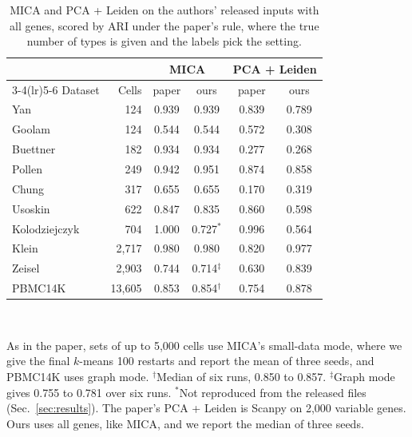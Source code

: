 \begin{table}[t]
\centering
\caption{MICA and PCA + Leiden on the authors' released inputs with all genes, scored by ARI under the paper's rule, where the true number of types is given and the labels pick the setting.}
\label{tab:repro}
\footnotesize
\setlength{\tabcolsep}{3.5pt}
\begin{tabular}{lrcccc}
\toprule
 & & \multicolumn{2}{c}{MICA} & \multicolumn{2}{c}{PCA + Leiden} \\
\cmidrule(lr){3-4}\cmidrule(lr){5-6}
Dataset & Cells & paper & ours & paper & ours \\
\midrule
Yan & 124 & 0.939 & 0.939 & 0.839 & 0.789 \\
Goolam & 124 & 0.544 & 0.544 & 0.572 & 0.308 \\
Buettner & 182 & 0.934 & 0.934 & 0.277 & 0.268 \\
Pollen & 249 & 0.942 & 0.951 & 0.874 & 0.858 \\
Chung & 317 & 0.655 & 0.655 & 0.170 & 0.319 \\
Usoskin & 622 & 0.847 & 0.835 & 0.860 & 0.598 \\
Kolodziejczyk & 704 & 1.000 & 0.727$^\ast$ & 0.996 & 0.564 \\
Klein & 2,717 & 0.980 & 0.980 & 0.820 & 0.977 \\
Zeisel & 2,903 & 0.744 & 0.714$^\ddagger$ & 0.630 & 0.839 \\
PBMC14K & 13,605 & 0.853 & 0.854$^\dagger$ & 0.754 & 0.878 \\
\bottomrule
\end{tabular}
\\[2pt]
\parbox{\columnwidth}{\scriptsize As in the paper, sets of up to 5,000 cells use MICA's small-data mode, where we give the final $k$-means 100 restarts and report the mean of three seeds, and PBMC14K uses graph mode. $^\dagger$Median of six runs, 0.850 to 0.857. $^\ddagger$Graph mode gives 0.755 to 0.781 over six runs. $^\ast$Not reproduced from the released files (Sec.~\ref{sec:results}). The paper's PCA + Leiden is Scanpy on 2,000 variable genes. Ours uses all genes, like MICA, and we report the median of three seeds.}
\end{table}
